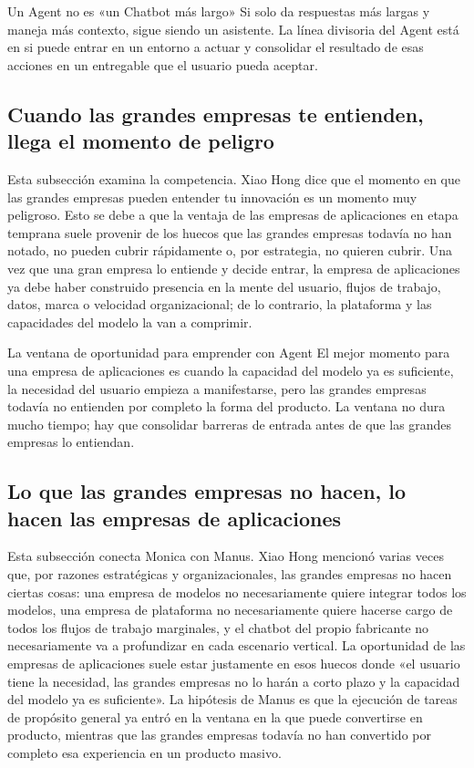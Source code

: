\begin{warningbox}{Un Agent no es «un Chatbot más largo»}
Si solo da respuestas más largas y maneja más contexto, sigue siendo un asistente. La línea divisoria del Agent está en si puede entrar en un entorno a actuar y consolidar el resultado de esas acciones en un entregable que el usuario pueda aceptar.
\end{warningbox}

\subsection{Cuando las grandes empresas te entienden, llega el momento de peligro}

Esta subsección examina la competencia. Xiao Hong dice que el momento en que las grandes empresas pueden entender tu innovación es un momento muy peligroso. Esto se debe a que la ventaja de las empresas de aplicaciones en etapa temprana suele provenir de los huecos que las grandes empresas todavía no han notado, no pueden cubrir rápidamente o, por estrategia, no quieren cubrir. Una vez que una gran empresa lo entiende y decide entrar, la empresa de aplicaciones ya debe haber construido presencia en la mente del usuario, flujos de trabajo, datos, marca o velocidad organizacional; de lo contrario, la plataforma y las capacidades del modelo la van a comprimir.

\begin{importantbox}{La ventana de oportunidad para emprender con Agent}
El mejor momento para una empresa de aplicaciones es cuando la capacidad del modelo ya es suficiente, la necesidad del usuario empieza a manifestarse, pero las grandes empresas todavía no entienden por completo la forma del producto. La ventana no dura mucho tiempo; hay que consolidar barreras de entrada antes de que las grandes empresas lo entiendan.
\end{importantbox}

\subsection{Lo que las grandes empresas no hacen, lo hacen las empresas de aplicaciones}

Esta subsección conecta Monica con Manus. Xiao Hong mencionó varias veces que, por razones estratégicas y organizacionales, las grandes empresas no hacen ciertas cosas: una empresa de modelos no necesariamente quiere integrar todos los modelos, una empresa de plataforma no necesariamente quiere hacerse cargo de todos los flujos de trabajo marginales, y el chatbot del propio fabricante no necesariamente va a profundizar en cada escenario vertical. La oportunidad de las empresas de aplicaciones suele estar justamente en esos huecos donde «el usuario tiene la necesidad, las grandes empresas no lo harán a corto plazo y la capacidad del modelo ya es suficiente». La hipótesis de Manus es que la ejecución de tareas de propósito general ya entró en la ventana en la que puede convertirse en producto, mientras que las grandes empresas todavía no han convertido por completo esa experiencia en un producto masivo.

